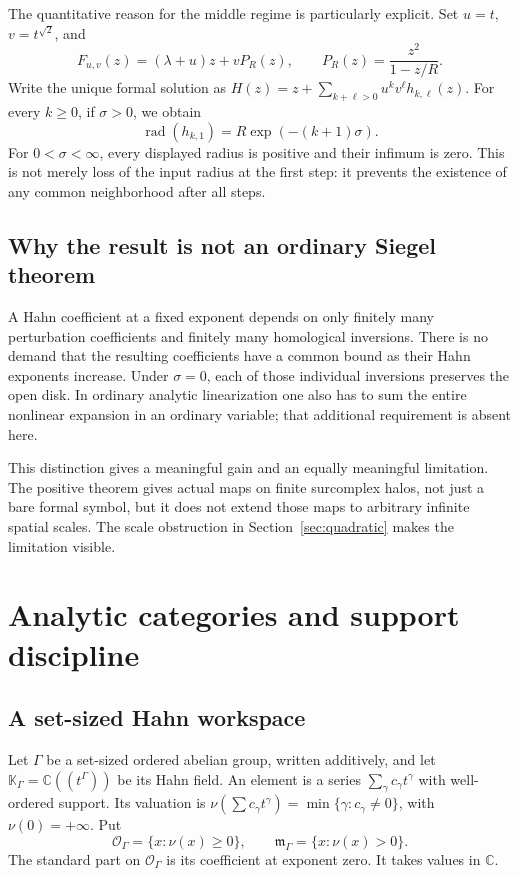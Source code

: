 \documentclass[11pt,a4paper]{article}
\numberwithin{equation}{section}
\theoremstyle{definition}
\theoremstyle{remark}
\newcommand{\C}{\mathbb C}
\newcommand{\K}{\mathbb K}
\newcommand{\mm}{\mathfrak m}
\newcommand{\rad}{\operatorname{rad}}
\begin{document}
The quantitative reason for the middle regime is particularly explicit.
Set $u=t$, $v=t^{\sqrt2}$, and
\begin{equation}\label{eq:familyintro}
 F_{u,v}(z)=(\lambda+u)z+vP_R(z),\qquad
 P_R(z)=\frac{z^2}{1-z/R}.
\end{equation}
Write the unique formal solution as
$H(z)=z+\sum_{k+\ell>0}u^kv^\ell h_{k,\ell}(z)$.
For every $k\ge0$, if $\sigma>0$, we obtain
\begin{equation}\label{eq:radiusintro}
 \boxed{\quad\rad(h_{k,1})=R\exp(-(k+1)\sigma).\quad}
\end{equation}
For $0<\sigma<\infty$, every displayed radius is positive and their infimum
is zero. This is not merely loss of the input radius at the first step:
it prevents the existence of any common neighborhood after all steps.

\subsection{Why the result is not an ordinary Siegel theorem}

A Hahn coefficient at a fixed exponent depends on only finitely many
perturbation coefficients and finitely many homological inversions. There
is no demand that the resulting coefficients have a common bound as their
Hahn exponents increase. Under $\sigma=0$, each of those individual
inversions preserves the open disk. In ordinary analytic linearization one
also has to sum the entire nonlinear expansion in an ordinary variable;
that additional requirement is absent here.

This distinction gives a meaningful gain and an equally meaningful
limitation. The positive theorem gives actual maps on finite surcomplex
halos, not just a bare formal symbol, but it does not extend those maps to
arbitrary infinite spatial scales. The scale obstruction in
Section~\ref{sec:quadratic} makes the limitation visible.

\section{Analytic categories and support discipline}\label{sec:categories}

\subsection{A set-sized Hahn workspace}

Let $\Gamma$ be a set-sized ordered abelian group, written additively, and
let $\K_\Gamma=\C((t^\Gamma))$ be its Hahn field. An element is a series
$\sum_\gamma c_\gamma t^\gamma$ with well-ordered support. Its valuation is
$\nu(\sum c_\gamma t^\gamma)=\min\{\gamma:c_\gamma\ne0\}$, with
$\nu(0)=+\infty$. Put
\[
 \mathcal O_\Gamma=\{x:\nu(x)\ge0\},\qquad
 \mm_\Gamma=\{x:\nu(x)>0\}.
\]
The standard part on $\mathcal O_\Gamma$ is its coefficient at exponent
zero. It takes values in $\C$.
\end{document}
